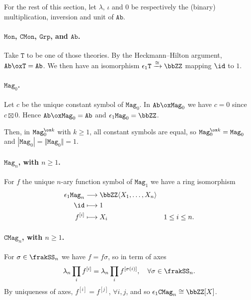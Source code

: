 \documentclass[a4paper, 12pt]{article}
\newcommand{\theory}{\mathtt}
\begin{document}
For the rest of this section, let $\lambda$, $\iota$ and $0$ be respectively the (binary) multiplication, inversion and unit of $\theory{Ab}$.

\paragraph*{$\theory{Mon}$, $\theory{CMon}$, $\theory{Grp}$, and $\theory{Ab}$.} Take $\theory{T}$ to be one of those theories. By the Heckmann--Hilton argument, $\theory{Ab} \ox \theory{T} = \theory{Ab}$. We then have an isomorphism $\epsilon_1 \theory{T} \xrightarrow{\cong} \bbZZ$ mapping $\id$ to $1$.

\paragraph*{$\theory{Mag}_0$.} Let $c$ be the unique constant symbol of $\theory{Mag}_0$. In $\theory{Ab} \ox \theory{Mag}_0$ we have $c = 0$ since $c \boxtimes 0$. Hence $\theory{Ab} \ox \theory{Mag}_0 = \theory{Ab}$ and $\epsilon_1 \theory{Mag}_0 = \bbZZ$.

Then, in $\theory{Mag}_0^{\ox k}$ with $k \geq 1$, all constant symbols are equal, so $\theory{Mag}_0^{\ox k} = \theory{Mag}_0$ and $| \theory{Mag}_0 | = \Vert \theory{Mag}_0 \Vert = 1$.

\paragraph*{$\theory{Mag}_n$, with $n \geq 1$.} For $f$ the unique $n$-ary function symbol of $\theory{Mag}_1$ we have a ring isomorphism
\begin{align*}
	\epsilon_1 \theory{Mag}_n &\longrightarrow \bbZZ \langle X_1, \ldots, X_n \rangle \\
	\id &\longmapsto 1 \\
	f^{[i]} &\longmapsto X_i & 1 \leq i \leq n .
\end{align*}

\paragraph*{$\theory{CMag}_n$, with $n \geq 1$.} For $\sigma \in \frakSS_n$ we have $f = f \sigma$, so in term of axes
\[ \lambda_n \prod_i f^{[i]} = \lambda_n \prod_i f^{[\sigma (i)]}, \quad \forall \sigma \in \frakSS_n . \]
By uniqueness of axes, $f^{[i]} = f^{[j]}$, $\forall i, j$, and so $\epsilon_1 \theory{CMag}_n \cong \bbZZ [X]$.
\end{document}
